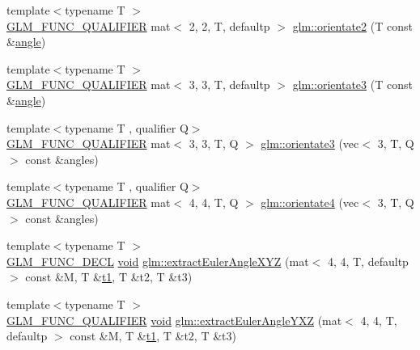 \begin{DoxyCompactItemize}
\item 
{\footnotesize template$<$typename T $>$ }\\\hyperlink{setup_8hpp_a33fdea6f91c5f834105f7415e2a64407}{G\+L\+M\+\_\+\+F\+U\+N\+C\+\_\+\+Q\+U\+A\+L\+I\+F\+I\+ER} mat$<$ 2, 2, T, defaultp $>$ \hyperlink{group__gtx__euler__angles_gae16738a9f1887cf4e4db6a124637608d}{glm\+::orientate2} (T const \&\hyperlink{_s_d_l__opengl__glext_8h_a9e06c1f76a20fed54ca742cd25cb02c4}{angle})
\item 
{\footnotesize template$<$typename T $>$ }\\\hyperlink{setup_8hpp_a33fdea6f91c5f834105f7415e2a64407}{G\+L\+M\+\_\+\+F\+U\+N\+C\+\_\+\+Q\+U\+A\+L\+I\+F\+I\+ER} mat$<$ 3, 3, T, defaultp $>$ \hyperlink{group__gtx__euler__angles_ga7ca98668a5786f19c7b38299ebbc9b4c}{glm\+::orientate3} (T const \&\hyperlink{_s_d_l__opengl__glext_8h_a9e06c1f76a20fed54ca742cd25cb02c4}{angle})
\item 
{\footnotesize template$<$typename T , qualifier Q$>$ }\\\hyperlink{setup_8hpp_a33fdea6f91c5f834105f7415e2a64407}{G\+L\+M\+\_\+\+F\+U\+N\+C\+\_\+\+Q\+U\+A\+L\+I\+F\+I\+ER} mat$<$ 3, 3, T, Q $>$ \hyperlink{group__gtx__euler__angles_ga7238c8e15c7720e3ca6a45ab151eeabb}{glm\+::orientate3} (vec$<$ 3, T, Q $>$ const \&angles)
\item 
{\footnotesize template$<$typename T , qualifier Q$>$ }\\\hyperlink{setup_8hpp_a33fdea6f91c5f834105f7415e2a64407}{G\+L\+M\+\_\+\+F\+U\+N\+C\+\_\+\+Q\+U\+A\+L\+I\+F\+I\+ER} mat$<$ 4, 4, T, Q $>$ \hyperlink{group__gtx__euler__angles_ga4a044653f71a4ecec68e0b623382b48a}{glm\+::orientate4} (vec$<$ 3, T, Q $>$ const \&angles)
\item 
{\footnotesize template$<$typename T $>$ }\\\hyperlink{setup_8hpp_ab2d052de21a70539923e9bcbf6e83a51}{G\+L\+M\+\_\+\+F\+U\+N\+C\+\_\+\+D\+E\+CL} \hyperlink{_s_d_l__opengles2__gl2ext_8h_ae5d8fa23ad07c48bb609509eae494c95}{void} \hyperlink{group__gtx__euler__angles_gacea701562f778c1da4d3a0a1cf091000}{glm\+::extract\+Euler\+Angle\+X\+YZ} (mat$<$ 4, 4, T, defaultp $>$ const \&M, T \&\hyperlink{_s_d_l__opengl__glext_8h_af48031a37b713afa3b0d0d7d29653d7c}{t1}, T \&t2, T \&t3)
\item 
{\footnotesize template$<$typename T $>$ }\\\hyperlink{setup_8hpp_a33fdea6f91c5f834105f7415e2a64407}{G\+L\+M\+\_\+\+F\+U\+N\+C\+\_\+\+Q\+U\+A\+L\+I\+F\+I\+ER} \hyperlink{_s_d_l__opengles2__gl2ext_8h_ae5d8fa23ad07c48bb609509eae494c95}{void} \hyperlink{group__gtx__euler__angles_gaf0937518e63037335a0e8358b6f053c5}{glm\+::extract\+Euler\+Angle\+Y\+XZ} (mat$<$ 4, 4, T, defaultp $>$ const \&M, T \&\hyperlink{_s_d_l__opengl__glext_8h_af48031a37b713afa3b0d0d7d29653d7c}{t1}, T \&t2, T \&t3)

\end{DoxyCompactItemize}
